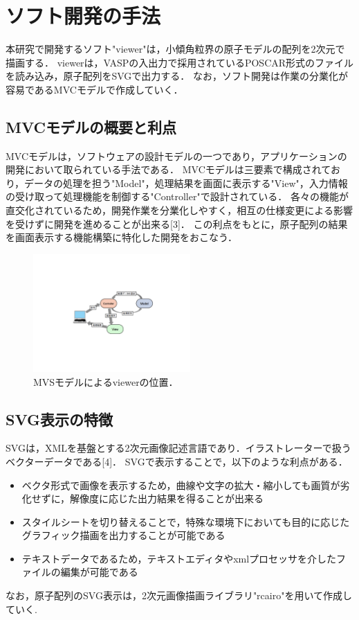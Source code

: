 
\section{ソフト開発の手法}
本研究で開発するソフト"viewer"は，小傾角粒界の原子モデルの配列を2次元で描画する．
viewerは，VASPの入出力で採用されているPOSCAR形式のファイルを読み込み，原子配列をSVGで出力する．
なお，ソフト開発は作業の分業化が容易であるMVCモデルで作成していく．

\subsection{MVCモデルの概要と利点}
MVCモデルは，ソフトウェアの設計モデルの一つであり，アプリケーションの開発において取られている手法である．
MVCモデルは三要素で構成されており，データの処理を担う"Model"，処理結果を画面に表示する"View"，入力情報の受け取って処理機能を制御する"Controller"で設計されている．
各々の機能が直交化されているため，開発作業を分業化しやすく，相互の仕様変更による影響を受けずに開発を進めることが出来る[3]．
この利点をもとに，原子配列の結果を画面表示する機能構築に特化した開発をおこなう．

\begin{figure}[htbp]\begin{center}
\includegraphics[width=6cm,bb=0 0 442 500]{../figs/./boundary_narita.005.jpg}
\caption{MVSモデルによるviewerの位置．}
\label{default}\end{center}\end{figure}
\subsection{SVG表示の特徴}
SVGは，XMLを基盤とする2次元画像記述言語であり．イラストレーターで扱うベクターデータである[4]．
SVGで表示することで，以下のような利点がある．

\begin{itemize}
\item ベクタ形式で画像を表示するため，曲線や文字の拡大・縮小しても画質が劣化せずに，解像度に応じた出力結果を得ることが出来る
\item スタイルシートを切り替えることで，特殊な環境下においても目的に応じたグラフィック描画を出力することが可能である
\item テキストデータであるため，テキストエディタやxmlプロセッサを介したファイルの編集が可能である
\end{itemize}
なお，原子配列のSVG表示は，2次元画像描画ライブラリ"rcairo"を用いて作成していく.

